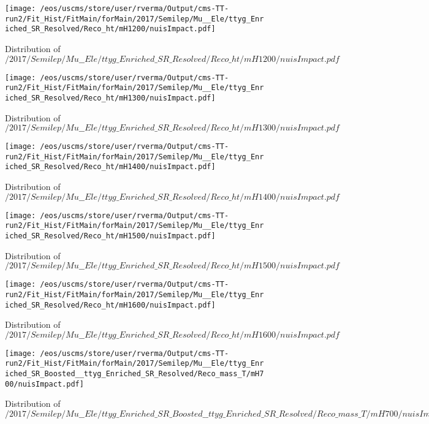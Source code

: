 \begin{figure}
\centering
\texttt{[image: /eos/uscms/store/user/rverma/Output/cms-TT-run2/Fit\_Hist/FitMain/forMain/2017/Semilep/Mu\_\_Ele/ttyg\_Enriched\_SR\_Resolved/Reco\_ht/mH1200/nuisImpact.pdf]}
\caption{Distribution of $/2017/Semilep/Mu\_\_Ele/ttyg\_Enriched\_SR\_Resolved/Reco\_ht/mH1200/nuisImpact.pdf$}
\end{figure}

\begin{figure}
\centering
\texttt{[image: /eos/uscms/store/user/rverma/Output/cms-TT-run2/Fit\_Hist/FitMain/forMain/2017/Semilep/Mu\_\_Ele/ttyg\_Enriched\_SR\_Resolved/Reco\_ht/mH1300/nuisImpact.pdf]}
\caption{Distribution of $/2017/Semilep/Mu\_\_Ele/ttyg\_Enriched\_SR\_Resolved/Reco\_ht/mH1300/nuisImpact.pdf$}
\end{figure}

\begin{figure}
\centering
\texttt{[image: /eos/uscms/store/user/rverma/Output/cms-TT-run2/Fit\_Hist/FitMain/forMain/2017/Semilep/Mu\_\_Ele/ttyg\_Enriched\_SR\_Resolved/Reco\_ht/mH1400/nuisImpact.pdf]}
\caption{Distribution of $/2017/Semilep/Mu\_\_Ele/ttyg\_Enriched\_SR\_Resolved/Reco\_ht/mH1400/nuisImpact.pdf$}
\end{figure}

\begin{figure}
\centering
\texttt{[image: /eos/uscms/store/user/rverma/Output/cms-TT-run2/Fit\_Hist/FitMain/forMain/2017/Semilep/Mu\_\_Ele/ttyg\_Enriched\_SR\_Resolved/Reco\_ht/mH1500/nuisImpact.pdf]}
\caption{Distribution of $/2017/Semilep/Mu\_\_Ele/ttyg\_Enriched\_SR\_Resolved/Reco\_ht/mH1500/nuisImpact.pdf$}
\end{figure}

\begin{figure}
\centering
\texttt{[image: /eos/uscms/store/user/rverma/Output/cms-TT-run2/Fit\_Hist/FitMain/forMain/2017/Semilep/Mu\_\_Ele/ttyg\_Enriched\_SR\_Resolved/Reco\_ht/mH1600/nuisImpact.pdf]}
\caption{Distribution of $/2017/Semilep/Mu\_\_Ele/ttyg\_Enriched\_SR\_Resolved/Reco\_ht/mH1600/nuisImpact.pdf$}
\end{figure}

\begin{figure}
\centering
\texttt{[image: /eos/uscms/store/user/rverma/Output/cms-TT-run2/Fit\_Hist/FitMain/forMain/2017/Semilep/Mu\_\_Ele/ttyg\_Enriched\_SR\_Boosted\_\_ttyg\_Enriched\_SR\_Resolved/Reco\_mass\_T/mH700/nuisImpact.pdf]}
\caption{Distribution of $/2017/Semilep/Mu\_\_Ele/ttyg\_Enriched\_SR\_Boosted\_\_ttyg\_Enriched\_SR\_Resolved/Reco\_mass\_T/mH700/nuisImpact.pdf$}
\end{figure}

